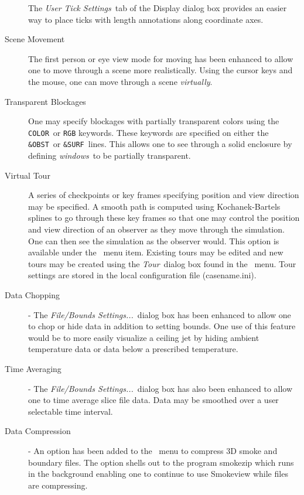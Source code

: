 \documentclass[11pt,twoside]{book}
\newcommand{\tourmenu}{\fbox{\tt Tour} }
\newcommand{\frameit}[1]{\fbox{\tt #1}}
\begin{document}
\begin{description}
The {\em User Tick Settings}\ tab of the Display dialog box
provides an easier way to place ticks with length annotations along coordinate axes.


\item[Scene Movement] The first person or eye view mode for moving
has been enhanced to allow one to move through a scene more
realistically.  Using the cursor keys and the
mouse, one can move through a scene {\em virtually}.

\item[Transparent Blockages] One may specify blockages with partially transparent colors
using the {\tt COLOR}\ or {\tt RGB} keywords.
These keywords are specified on either the {\tt \&OBST}\ or {\tt \&SURF}\ lines.
This allows one to see through a solid enclosure by defining
{\em windows}\ to be partially transparent.

\item[Virtual Tour]   A series of checkpoints or key frames
specifying position and view direction may be specified. A smooth
path is computed using Kochanek-Bartels splines\cite{Moller:02} to
go through these key frames so that one may control the position
and view direction of an observer as they move through the
simulation. One can then see the simulation as the observer would.
This option is available under the \tourmenu\ menu item. Existing
tours may be edited and new tours may be created using the
{\em Tour}\ dialog box found in the \frameit{Dialogs}\ menu. Tour
settings are stored in the local configuration file
(casename.ini).

\item[Data Chopping] - The {\em File/Bounds Settings...}\
dialog box has been enhanced to allow one to chop or hide data in
addition to setting bounds. One use of this feature would be to
more easily visualize a ceiling jet by hiding ambient temperature
data or data below a prescribed temperature.

\item[Time Averaging] - The {\em File/Bounds Settings...}\
dialog box has also been enhanced to allow one to time average
slice file data.  Data may be smoothed over a user selectable time
interval.

\item[Data Compression] - An option has been added to the
\ menu to compress 3D smoke and boundary
files. The option shells out to the program smokezip which runs in
the background enabling one to continue to use Smokeview while
files are compressing.

\end{description}
\end{document}
